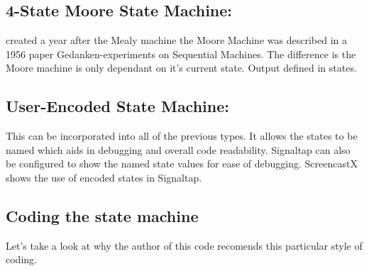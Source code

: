       \subsection{4-State Moore State Machine:} created a year after the Mealy machine the Moore Machine was described in a 1956 paper Gedanken-experiments on Sequential Machines. The difference is the Moore machine is only dependant on it's current state. Output defined in states. \cite{Wikipedia:MooreMachine}

      \subsection{User-Encoded State Machine:} This can be incorporated into all of the previous types. It allows the states to be named which aids in debugging and overall code readability. Signaltap can also be configured to show the named state values for ease of debugging. ScreencastX shows the use of encoded states in Signaltap.

      \clearpage
      \subsection{Coding the state machine}
        \newpage
        
      \clearpage


      
      Let's take a look at why the author of this code recomends this particular style of coding.

